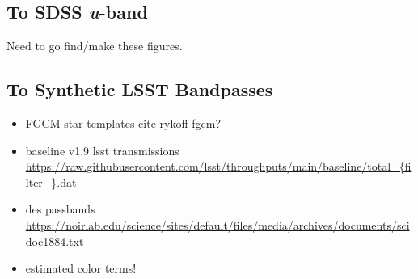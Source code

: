 \subsection{To SDSS \textit{u}-band}
\label{sec:tosdss}
Need to go find/make these figures. 
\subsection{To Synthetic LSST Bandpasses}
\begin{itemize}
    \item FGCM star templates cite rykoff fgcm? 
    \item baseline v1.9 lsst transmissions \url{https://raw.githubusercontent.com/lsst/throughputs/main/baseline/total_{filter_}.dat}
    \item des passbands \url{https://noirlab.edu/science/sites/default/files/media/archives/documents/scidoc1884.txt}
    \item estimated color terms!
\end{itemize}
